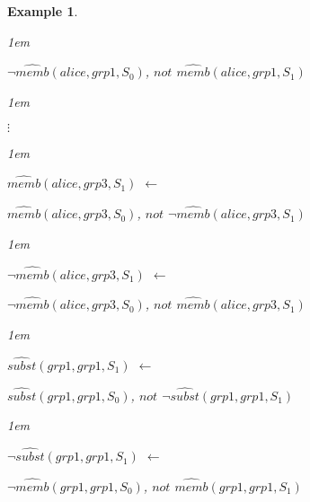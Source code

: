 \documentclass[11pt]{report}
\newtheorem{vexample}{Example}[chapter]
\newenvironment{vquote}
{
  \begin{list}{}{\leftmargin 1em}\item[]
}
{
  \end{list}
}
\begin{document}
\begin{vexample}
\begin{enumerate}
\begin{vquote}
                  \hspace{1em}
                  $\lnot\hat{memb}(alice, grp1, S_{0})$,
                  $not$ $\hat{memb}(alice, grp1, S_{1})$
                \end{vquote}
            
                \begin{vquote}
                  \hspace{2em}$\vdots$
                \end{vquote}
            
                \begin{vquote}
                  $\hat{memb}(alice, grp3, S_{1})$ $\leftarrow$
            
                  \hspace{1em}
                  $\hat{memb}(alice, grp3, S_{0})$,
                  $not$ $\lnot\hat{memb}(alice, grp3, S_{1})$
                \end{vquote}
            
                \begin{vquote}
                  $\lnot\hat{memb}(alice, grp3, S_{1})$ $\leftarrow$
            
                  \hspace{1em}
                  $\lnot\hat{memb}(alice, grp3, S_{0})$,
                  $not$ $\hat{memb}(alice, grp3, S_{1})$
                \end{vquote}
            
                \begin{vquote}
                  $\hat{subst}(grp1, grp1, S_{1})$ $\leftarrow$
            
                  \hspace{1em}
                  $\hat{subst}(grp1, grp1, S_{0})$,
                  $not$ $\lnot\hat{subst}(grp1, grp1, S_{1})$
                \end{vquote}

                \begin{vquote}
                  $\lnot\hat{subst}(grp1, grp1, S_{1})$ $\leftarrow$
            
                  \hspace{1em}
                  $\lnot\hat{memb}(grp1, grp1, S_{0})$,
                  $not$ $\hat{memb}(grp1, grp1, S_{1})$
                \end{vquote}
            

\end{enumerate}
\end{vexample}
\end{document}
